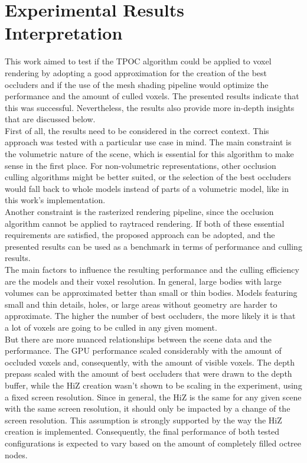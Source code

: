 \section{Experimental Results Interpretation}

This work aimed to test if the \ac{TPOC} algorithm could be applied to voxel rendering by adopting a good approximation 
for the creation of the best occluders and if the use of the mesh shading pipeline would optimize the performance and 
the amount of culled voxels. The presented results indicate that this was successful. Nevertheless, the results also 
provide more in-depth insights that are discussed below. \\

\noindent
First of all, the results need to be considered in the correct context. This approach was tested with a particular use 
case in mind. The main constraint is the volumetric nature of the scene, which is essential for this algorithm to make 
sense in the first place. For non-volumetric representations, other occlusion culling algorithms might be better suited, 
or the selection of the best occluders would fall back to whole models instead of parts of a volumetric model, like in 
this work's implementation. \\

\noindent
Another constraint is the rasterized rendering pipeline, since the occlusion algorithm cannot be applied to raytraced 
rendering. If both of these essential requirements are satisfied, the proposed approach can be adopted, and the 
presented results can be used as a benchmark in terms of performance and culling results. \\

\noindent
The main factors to influence the resulting performance and the culling efficiency are the models and their voxel 
resolution. In general, large bodies with large volumes can be approximated better than small or thin bodies. Models 
featuring small and thin details, holes, or large areas without geometry are harder to approximate. The higher the 
number of best occluders, the more likely it is that a lot of voxels are going to be culled in any given moment. \\

\noindent
But there are more nuanced relationships between the scene data and the performance. The \ac{GPU} performance scaled 
considerably with the amount of occluded voxels and, consequently, with the amount of visible voxels. The depth prepass 
scaled with the amount of best occluders that were drawn to the depth buffer, while the \ac{HiZ} creation wasn't shown 
to be scaling in the experiment, using a fixed screen resolution. Since in general, the \ac{HiZ} is the same for any 
given scene with the same screen resolution, it should only be impacted by a change of the screen resolution. This 
assumption is strongly supported by the way the \ac{HiZ} creation is implemented. Consequently, the final performance 
of both tested configurations is expected to vary based on the amount of completely filled octree nodes. \\

